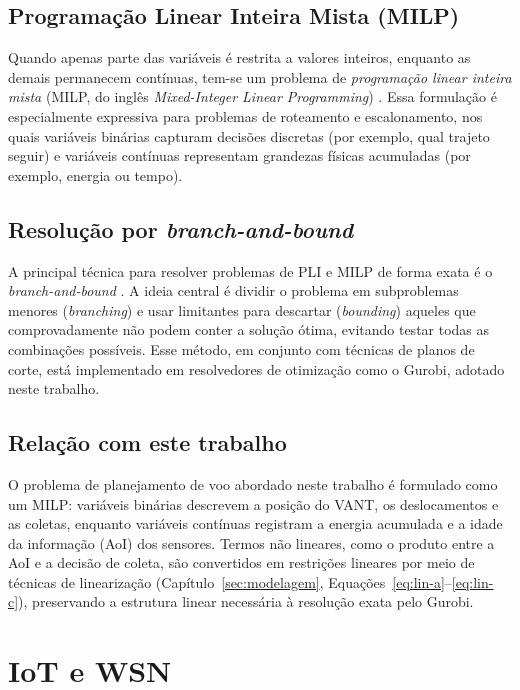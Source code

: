 \subsection{Programação Linear Inteira Mista (MILP)}
Quando apenas parte das variáveis é restrita a valores inteiros, enquanto as demais permanecem contínuas, tem-se um problema de \emph{programação linear inteira mista} (MILP, do inglês \textit{Mixed-Integer Linear Programming}) \cite{arenales2007pesquisa}. Essa formulação é especialmente expressiva para problemas de roteamento e escalonamento, nos quais variáveis binárias capturam decisões discretas (por exemplo, qual trajeto seguir) e variáveis contínuas representam grandezas físicas acumuladas (por exemplo, energia ou tempo).

\subsection{Resolução por \textit{branch-and-bound}}
A principal técnica para resolver problemas de PLI e MILP de forma exata é o \emph{branch-and-bound} \cite{arenales2007pesquisa, land1960branchbound}. A ideia central é dividir o problema em subproblemas menores (\emph{branching}) e usar limitantes para descartar (\emph{bounding}) aqueles que comprovadamente não podem conter a solução ótima, evitando testar todas as combinações possíveis. Esse método, em conjunto com técnicas de planos de corte, está implementado em resolvedores de otimização como o Gurobi, adotado neste trabalho.

\subsection{Relação com este trabalho}
O problema de planejamento de voo abordado neste trabalho é formulado como um MILP: variáveis binárias descrevem a posição do VANT, os deslocamentos e as coletas, enquanto variáveis contínuas registram a energia acumulada e a idade da informação (AoI) dos sensores. Termos não lineares, como o produto entre a AoI e a decisão de coleta, são convertidos em restrições lineares por meio de técnicas de linearização (Capítulo~\ref{sec:modelagem}, Equações~\eqref{eq:lin-a}--\eqref{eq:lin-c}), preservando a estrutura linear necessária à resolução exata pelo Gurobi.

\section{IoT e WSN}
\label{sec:iot-wsn}

